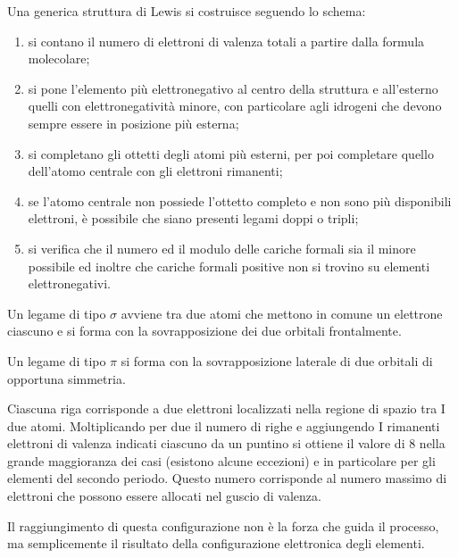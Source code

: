 \begin{axiom}
    Una generica struttura di Lewis si costruisce seguendo lo schema:
    \begin{enumerate}
        \item si contano il numero di elettroni di valenza totali a partire dalla formula molecolare;
        \item si pone l'elemento più elettronegativo al centro della struttura e all'esterno quelli con elettronegatività minore, con particolare agli idrogeni che devono sempre essere in posizione più esterna;
        \item si completano gli ottetti degli atomi più esterni, per poi completare quello dell'atomo centrale con gli elettroni rimanenti;
        \item se l'atomo centrale non possiede l'ottetto completo e non sono più disponibili elettroni, è possibile che siano presenti legami doppi o tripli;
        \item si verifica che il numero ed il modulo delle cariche formali sia il minore possibile ed inoltre che cariche formali positive non si trovino su elementi elettronegativi.
    \end{enumerate}
\end{axiom}
\begin{defn}
    Un legame di tipo $\sigma$ avviene tra due atomi che mettono in comune un elettrone ciascuno e si forma con la sovrapposizione dei due orbitali frontalmente.
\end{defn}
\begin{defn}[legame $\pi$]
    Un legame di tipo $\pi$ si forma con la sovrapposizione laterale di due orbitali di opportuna simmetria.
\end{defn}
Ciascuna riga corrisponde a due elettroni localizzati nella regione di spazio tra I due atomi. Moltiplicando per
due il numero di righe e aggiungendo I rimanenti elettroni di valenza indicati ciascuno da un puntino si ottiene
il valore di 8 nella grande maggioranza dei casi (esistono alcune eccezioni) e in particolare per gli elementi
del secondo periodo. Questo numero corrisponde al numero massimo di elettroni che possono essere allocati
nel guscio di valenza.
\begin{obs}
    Il raggiungimento di questa configurazione non
è la forza che guida il processo, ma semplicemente il risultato della configurazione elettronica degli
elementi.
\end{obs}

